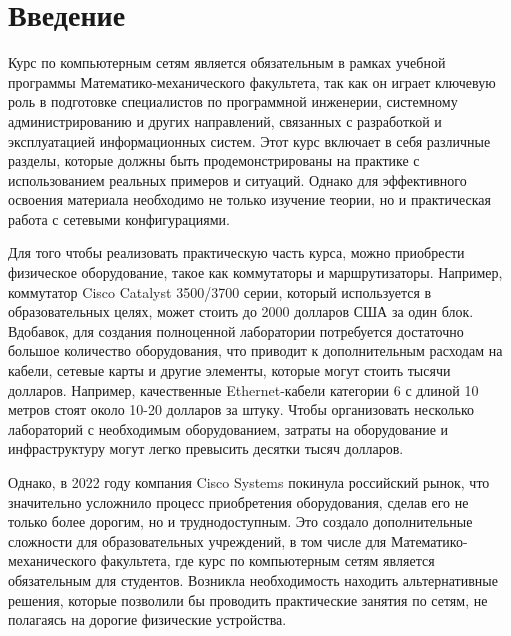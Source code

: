
\section*{Введение}
\thispagestyle{withCompileDate}

Курс по компьютерным сетям\cite{stepik} является обязательным в рамках учебной программы Математико-механического факультета, так как он играет ключевую роль в подготовке специалистов по программной инженерии, системному администрированию и других направлений, связанных с разработкой и эксплуатацией информационных систем.
Этот курс включает в себя различные разделы, которые должны быть продемонстрированы на практике с использованием реальных примеров и ситуаций.
Однако для эффективного освоения материала необходимо не только изучение теории, но и практическая работа с сетевыми конфигурациями.

Для того чтобы реализовать практическую часть курса, можно приобрести физическое оборудование, такое как коммутаторы и маршрутизаторы.
Например, коммутатор Cisco\cite{cisco} Catalyst 3500/3700 серии, который используется в образовательных целях, может стоить до 2000 долларов США за один блок. Вдобавок, для создания полноценной лаборатории потребуется достаточно большое количество оборудования, что приводит к дополнительным расходам на кабели, сетевые карты и другие элементы, которые могут стоить тысячи долларов.
Например, качественные Ethernet-кабели категории 6 с длиной 10 метров стоят около 10-20 долларов за штуку.
Чтобы организовать несколько лабораторий с необходимым оборудованием, затраты на оборудование и инфраструктуру могут легко превысить десятки тысяч долларов.

Однако, в 2022 году компания Cisco Systems покинула российский рынок, что значительно усложнило процесс приобретения оборудования, сделав его не только более дорогим, но и труднодоступным.
Это создало дополнительные сложности для образовательных учреждений, в том числе для Математико-механического факультета, где курс по компьютерным сетям является обязательным для студентов.
Возникла необходимость находить альтернативные решения, которые позволили бы проводить практические занятия по сетям, не полагаясь на дорогие физические устройства.

